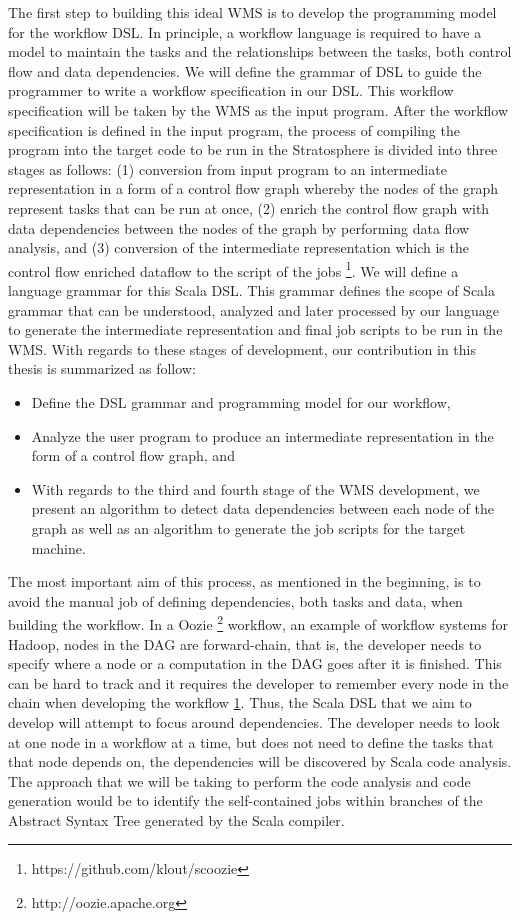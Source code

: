 The first step to building this ideal WMS is to develop the programming model for the workflow DSL. In principle, a workflow language is required to have a model to maintain the tasks and the relationships between the tasks, both control flow and data dependencies. We will define the grammar of DSL to guide the programmer to write a workflow specification in our DSL. This workflow specification will be taken by the WMS as the input program. After the workflow specification is defined in the input program, the process of compiling the program into the target code to be run in the Stratosphere is divided into three stages as follows: (1) conversion from input program to an intermediate representation in a form of a control flow graph whereby the nodes of the graph represent tasks that can be run at once, (2) enrich the control flow graph with data dependencies between the nodes of the graph by performing data flow analysis, and (3) conversion of the intermediate representation which is the control flow enriched dataflow to the script of the jobs \footnote{\label{scoozie}https://github.com/klout/scoozie}. We will define a language grammar for this Scala DSL. This grammar defines the scope of Scala grammar \cite{odersky2004scala} that can be understood, analyzed and later processed by our language  to generate the intermediate representation and final job scripts to be run in the WMS. With regards to these stages of development, our contribution in this thesis is summarized as follow:
\begin{itemize}
\item Define the DSL grammar and programming model for our workflow,
\item Analyze the user program to produce an intermediate representation in the form of a control flow graph, and 
\item With regards to the third and fourth stage of the WMS development, we present an algorithm to detect data dependencies between each node of the graph as well as an algorithm to generate the job scripts for the target machine. 
\end{itemize}

The most important aim of this process, as mentioned in the beginning, is to avoid the manual job of defining dependencies,  both tasks and data, when building the workflow. In a Oozie \footnote{\label{oozie}http://oozie.apache.org} workflow, an example of workflow systems for Hadoop, nodes in the DAG are forward-chain, that is, the developer needs to specify where a node or a computation in the DAG goes after it is finished. This can be hard to track and it requires the developer to remember every node in the chain when developing the workflow \cref{scoozie}. Thus, the Scala DSL that we aim to develop will attempt to focus around dependencies. The developer needs to look at one node in a workflow at a time, but does not need to define the tasks that that node depends on, the dependencies will be discovered by Scala code analysis. The approach that we will be taking to perform the code analysis and code generation would be to identify the self-contained jobs within branches of the Abstract Syntax Tree generated by the Scala compiler. 

